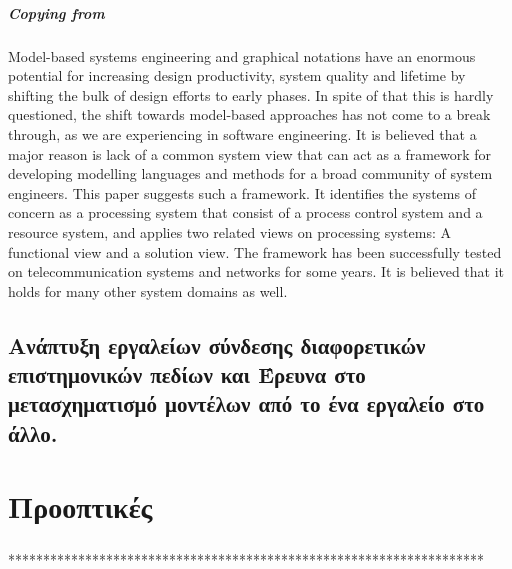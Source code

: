 \documentclass[a4paper,12pt,twoside]{report}
\begin{document}
			\paragraph{Copying from \cite{ProcessingSysPar}} {Model-based systems engineering and graphical notations have an enormous potential for increasing design productivity, system quality and lifetime by shifting the bulk of design efforts to early phases. In spite of that this is hardly questioned, the shift towards model-based approaches has not come to a break through, as we are experiencing in software engineering. It is believed that a major reason is lack of a common system view that can act as a framework for developing modelling languages and methods for a broad community of system engineers. This paper suggests such a framework. It identifies the systems of concern as a processing system that consist of a process control system and a resource system, and applies two related views on processing systems: A functional view and a solution view. The framework has been successfully tested on telecommunication systems and networks for some years. It is believed that it holds for many other system domains as well.
			}
			
		\section{Ανάπτυξη εργαλείων σύνδεσης διαφορετικών επιστημονικών πεδίων και Έρευνα στο μετασχηματισμό μοντέλων από το ένα εργαλείο στο άλλο.}

	\chapter{Προοπτικές}
		\label{κεφ.:Προοπτικές}
		
		\paragraph{} {********************************************************************
		}
\end{document}
